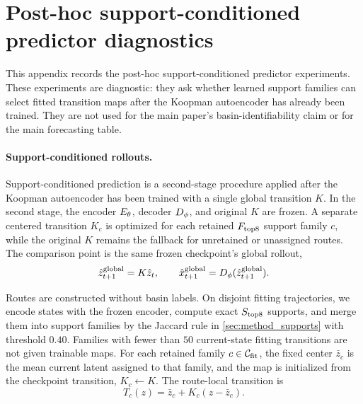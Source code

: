 \section{Post-hoc support-conditioned predictor diagnostics}
\label{app:support_conditioned_predictors}

This appendix records the post-hoc support-conditioned predictor experiments. These experiments are diagnostic: they ask whether learned support families can select fitted transition maps after the Koopman autoencoder has already been trained. They are not used for the main paper's basin-identifiability claim or for the main forecasting table.

\paragraph{Support-conditioned rollouts.}
Support-conditioned prediction is a second-stage procedure applied after the Koopman autoencoder has been trained with a single global transition \(K\). In the second stage, the encoder \(E_\theta\), decoder \(D_\phi\), and original \(K\) are frozen. A separate centered transition \(K_c\) is optimized for each retained \(F_{\rm top8}\) support family \(c\), while the original \(K\) remains the fallback for unretained or unassigned routes. The comparison point is the same frozen checkpoint's global rollout,
\begin{equation}
  \hat z_{t+1}^{\rm global}=K\hat z_t,\qquad
  \hat x_{t+1}^{\rm global}=D_\phi(\hat z_{t+1}^{\rm global}).
  \label{eq:global_rollout}
\end{equation}

Routes are constructed without basin labels. On disjoint fitting trajectories, we encode states with the frozen encoder, compute exact \(S_{\rm top8}\) supports, and merge them into support families by the Jaccard rule in \cref{sec:method_supports} with threshold \(0.40\). Families with fewer than \(50\) current-state fitting transitions are not given trainable maps. For each retained family \(c\in\mathcal C_{\rm fit}\), the fixed center \(\bar z_c\) is the mean current latent assigned to that family, and the map is initialized from the checkpoint transition, \(K_c\leftarrow K\). The route-local transition is
\begin{equation}
  T_c(z)=\bar z_c+K_c(z-\bar z_c).
  \label{eq:family_local_map}
\end{equation}

